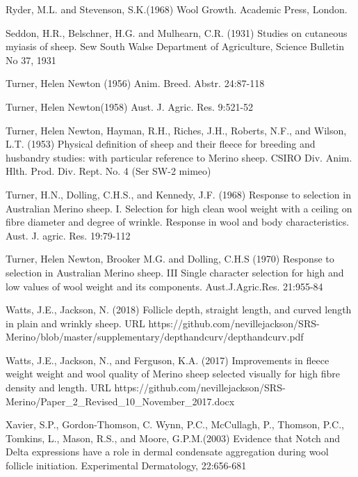 \documentclass[titlepage]{article}  %
\begin{document}
\begin{thebibliography}{99}
Ryder, M.L. and Stevenson, S.K.(1968) Wool Growth. Academic Press, London.

Seddon, H.R., Belschner, H.G. and Mulhearn, C.R. (1931)  Studies on cutaneous myiasis of sheep. Sew South Walse Department of Agriculture, Science Bulletin No 37, 1931

Turner, Helen Newton (1956) Anim. Breed. Abstr. 24:87-118

Turner, Helen Newton(1958) Aust. J. Agric. Res. 9:521-52

Turner, Helen Newton, Hayman, R.H., Riches, J.H., Roberts, N.F., and Wilson, L.T. (1953) Physical definition of sheep and their fleece for breeding and husbandry studies: with particular reference to Merino sheep. CSIRO Div. Anim. Hlth. Prod. Div. Rept. No. 4 (Ser SW-2 mimeo)

Turner, H.N., Dolling, C.H.S., and Kennedy, J.F. (1968) Response to selection in Australian Merino sheep. I. Selection for high clean wool weight with a ceiling on fibre diameter and degree of wrinkle. Response in wool and body characteristics. Aust. J. agric. Res. 19:79-112

Turner, Helen Newton, Brooker M.G. and Dolling, C.H.S (1970) Response to selection in Australian Merino sheep. III Single character selection for high and low values of wool weight and its components. Aust.J.Agric.Res. 21:955-84

Watts, J.E., Jackson, N. (2018) Follicle depth, straight length, and curved length in plain and wrinkly sheep. URL https://github.com/nevillejackson/SRS-Merino/blob/master/supplementary/depthandcurv/depthandcurv.pdf

Watts, J.E., Jackson, N., and Ferguson, K.A. (2017) Improvements in fleece weight weight and wool quality of Merino sheep selected visually for high fibre density and length. URL https://github.com/nevillejackson/SRS-Merino/Paper\_2\_Revised\_10\_November\_2017.docx 

Xavier, S.P., Gordon-Thomson, C. Wynn, P.C., McCullagh, P., Thomson, P.C., Tomkins, L., Mason, R.S., and Moore, G.P.M.(2003) Evidence that Notch and Delta expressions have a role in dermal condensate aggregation during wool follicle initiation. Experimental Dermatology, 22:656-681

\end{thebibliography}
\end{document}
